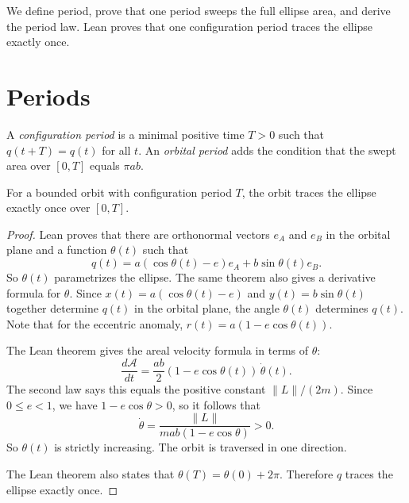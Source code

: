We define period, prove that one period sweeps the full ellipse area, and derive the period law.
Lean proves that one configuration period traces the ellipse exactly once.

\section{Periods}

\begin{definition}\label{def:period}
A \emph{configuration period} is a minimal positive time $T > 0$ such that $q(t + T) = q(t)$ for all $t$.
An \emph{orbital period} adds the condition that the swept area over $[0, T]$ equals $\pi ab$.
\leanok
\end{definition}

\begin{proposition}\label{thm:ellipse-traversal}
For a bounded orbit with configuration period $T$, the orbit traces the ellipse exactly once over $[0, T]$.
\leanok
\begin{proof}
Lean proves that there are orthonormal vectors $e_A$ and $e_B$ in the orbital plane and a function $\theta(t)$ such that
\[
  q(t) = a(\cos \theta(t) - e)e_A + b \sin \theta(t)e_B.
\]
So $\theta(t)$ parametrizes the ellipse.
The same theorem also gives a derivative formula for $\theta$.
Since $x(t) = a(\cos\theta(t) - e)$ and $y(t) = b\sin\theta(t)$ together determine $q(t)$ in the orbital plane, the angle $\theta(t)$ determines $q(t)$.
Note that for the eccentric anomaly, $r(t) = a(1 - e\cos\theta(t))$.

The Lean theorem gives the areal velocity formula in terms of $\theta$:
\[
  \frac{d\mathcal A}{dt} = \frac{ab}{2}(1 - e\cos\theta(t))\,\dot\theta(t).
\]
The second law says this equals the positive constant $\|L\|/(2m)$.
Since $0 \le e < 1$, we have $1 - e\cos\theta > 0$, so it follows that
\[
  \dot\theta = \frac{\|L\|}{mab(1 - e\cos\theta)} > 0.
\]
So $\theta(t)$ is strictly increasing.
The orbit is traversed in one direction.

The Lean theorem also states that $\theta(T) = \theta(0) + 2\pi$.
Therefore $q$ traces the ellipse exactly once.
\end{proof}
\end{proposition}

